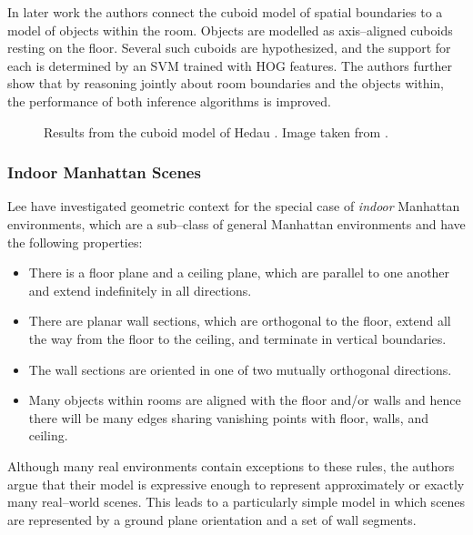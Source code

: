 In later work \cite{Hedau2010} the authors connect the cuboid model of
spatial boundaries to a model of objects within the room. Objects are
modelled as axis--aligned cuboids resting on the floor. Several such
cuboids are hypothesized, and the support for each is determined by an
SVM trained with HOG features. The authors further show that by
reasoning jointly about room boundaries and the objects within, the
performance of both inference algorithms is improved.

\begin{figure}[tb]
  \centering
  \caption{Results from the cuboid model of Hedau \etal
    \cite{Hedua2009,Hedua2010}. Image taken from \cite{Hedua2010}.}
  \label{fig:hedau-result}
\end{figure}

\subsubsection{Indoor Manhattan Scenes}

Lee \etal \cite{Lee09} have investigated geometric context for the
special case of \textit{indoor} Manhattan environments, which are a
sub--class of general Manhattan environments and have the following
properties:
\begin{itemize}
  \item{There is a floor plane and a ceiling plane, which are parallel
    to one another and extend indefinitely in all directions.}
  \item{There are planar wall sections, which are orthogonal to the
    floor, extend all the way from the floor to the ceiling, and
    terminate in vertical boundaries.}
  \item{The wall sections are oriented in one of two mutually
    orthogonal directions.}
  \item{Many objects within rooms are aligned with the floor and/or
    walls and hence there will be many edges sharing vanishing points
    with floor, walls, and ceiling.}
\end{itemize}

Although many real environments contain exceptions to these rules, the
authors argue that their model is expressive enough to represent
approximately or exactly many real--world scenes. This leads to a
particularly simple model in which scenes are represented by a ground
plane orientation and a set of wall segments.

